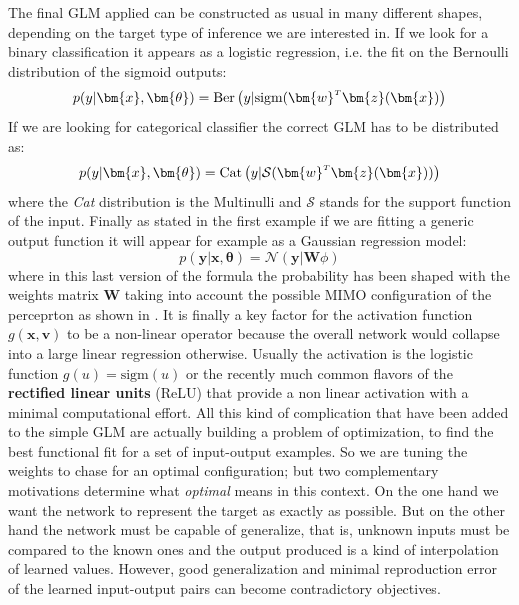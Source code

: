 The final \acl{GLM} applied can be constructed as usual in many different shapes, depending on the target type of inference we are interested in. If we look for a binary classification it appears as a logistic regression, i.e. the fit on the Bernoulli distribution of the sigmoid outputs:
\begin{equation}
    p(y|\bm{x}, \bm{\theta}) = \text{Ber}\left( y|\text{sigm}(\transpose{\bm{w}}\bm{z}(\bm{x}) \right)
\end{equation}
If we are looking for categorical classifier the correct GLM has to be distributed as:
\begin{equation}
    p(y|\bm{x}, \bm{\theta}) = \text{Cat}\left( y|\mathcal{S}(\transpose{\bm{w}}\bm{z}(\bm{x})) \right)
\end{equation}
where the \textit{Cat} distribution is the Multinulli and $\mathcal{S}$ stands for the support function of the input.
Finally as stated in the first example if we are fitting a generic output function it will appear for example as a Gaussian regression model:
\begin{equation}
    p(\bm{y}|\bm{x}, \bm{\theta}) = \mathcal{N}\left( \bm{y}|\bm{W} \phi \right)
\end{equation}
where in this last version of the formula the probability has been shaped with the weights matrix $\bm{W}$ taking into account the possible MIMO configuration of the perceprton as shown in \Figure{\ref{fig:mlp_a}}.
It is finally a key factor for the activation function $g(\bm{x},\bm{v})$ to be a non-linear operator because the overall network would collapse into a large linear regression otherwise. Usually the activation is the logistic function $g(u) = \text{sigm}(u)$ or the recently much common flavors of the \textbf{rectified linear units} (ReLU) that provide a non linear activation with a minimal computational effort.
%
% 
All this kind of complication that have been added to the simple GLM are actually building a problem of optimization, to find the best functional fit for a set of input-output examples. So we are tuning the weights to chase for an optimal configuration; but two complementary motivations determine what \textit{optimal} means in this context. On the one hand we want the network to represent the target as exactly as possible. But on the other hand the network must be capable of generalize, that is, unknown inputs must be compared to the known ones and the output produced is a kind of interpolation of learned values. However, good generalization and minimal reproduction error of the learned input-output pairs can become contradictory objectives.

